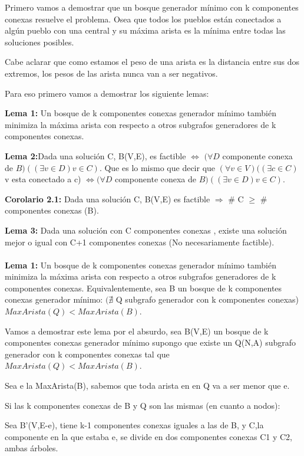 Primero vamos a demostrar que un bosque generador mínimo con k componentes conexas resuelve el problema. Osea que todos los pueblos están conectados a algún pueblo con una central y su máxima arista es la mínima entre todas las soluciones posibles.

Cabe aclarar que como estamos el peso de una arista es la distancia entre sus dos extremos, los pesos de las arista nunca van a ser negativos.

Para eso primero vamos a demostrar los siguiente lemas:

\textbf{Lema 1:} Un bosque de k componentes conexas generador mínimo también minimiza la máxima arista con respecto a otros subgrafos generadores de k componentes conexas.

\textbf{Lema 2:}Dada una solución C, B(V,E), es factible $\Longleftrightarrow$ $(\forall D$ componente conexa de $B)((\exists v \in D) v \in C)$. Que es lo mismo que decir que $(\forall v \in V)((\exists c \in C)$ v esta conectado a c) $\Leftrightarrow (\forall D$ componente conexa de $B)((\exists v \in D) v \in C)$.

\textbf{Corolario 2.1:} Dada una solución C, B(V,E) es factible $\Rightarrow$ \# C $\geq$ \# componentes conexas (B).

\textbf{Lema 3:} Dada una solución con C componentes conexas , existe una solución mejor o igual con C+1 componentes conexas (No necesariamente factible). \\ \\ 


\textbf{Lema 1:} Un bosque de k componentes conexas generador mínimo también minimiza la máxima arista con respecto a otros subgrafos generadores de k componentes conexas. Equivalentemente, sea B un bosque de k componentes conexas generador mínimo: $(\nexists$ Q subgrafo generador con k componentes conexas) $MaxArista(Q) < MaxArista(B)$.

Vamos a demostrar este lema por el absurdo, sea B(V,E) un bosque de k componentes conexas generador mínimo supongo que existe un Q(N,A) subgrafo generador con k componentes conexas tal que $MaxArista(Q) < MaxArista(B)$.

Sea e la MaxArista(B), sabemos que toda arista en en Q va a ser menor que e.

Si las k componentes conexas de B y Q son las mismas (en cuanto a nodos):

Sea B'(V,E-e), tiene k-1 componentes conexas iguales a las de B, y C,la componente en la que estaba e, se divide en dos componentes conexas C1 y C2, ambas árboles.

